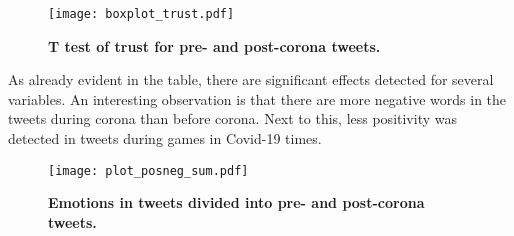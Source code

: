 \documentclass[12pt]{article}
\begin{document}
\begin{figure}[H]
\caption{\textbf{T test of trust for pre- and post-corona tweets.}}
\texttt{[image: boxplot\_trust.pdf]}

\end{figure}
As already evident in the table, there are significant effects detected for several variables. An interesting observation is that there are more negative words in the tweets during corona than before corona. Next to this, less positivity was detected in tweets during games in Covid-19 times.

\begin{figure}[H]
\caption{\textbf{Emotions in tweets divided into pre- and post-corona tweets.}}
\texttt{[image: plot\_posneg\_sum.pdf]}

\end{figure}


\end{document}
